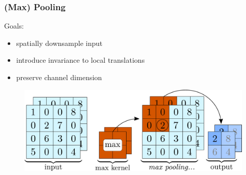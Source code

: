 \documentclass[14pt, t]{beamer}
\begin{document}
\begin{frame}
    \frametitle{(Max) Pooling}

    Goals:
    \begin{itemize}
    
        \item spatially downsample input
    
        \item introduce invariance to local translations

        \item preserve channel dimension

    \end{itemize}
    \vspace{1mm}
    \vspace{-1mm}
    \begin{figure}[htb!]
        \centering
        \includegraphics[width=\linewidth]{vector/pooling.pdf}
    \end{figure}   

\end{frame}
\end{document}
